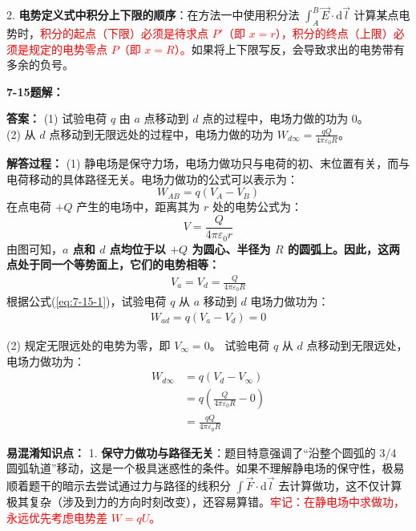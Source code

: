 2. \textbf{电势定义式中积分上下限的顺序}：在方法一中使用积分法 $\int_A^B \vec{E} \cdot \mathrm{d}\vec{l}$ 计算某点电势时，\textcolor{red}{积分的起点（下限）必须是待求点 $P'$（即 $x=r$），积分的终点（上限）必须是规定的电势零点 $P$（即 $x=R$）。}如果将上下限写反，会导致求出的电势带有多余的负号。

\vspace{2em}

\textbf{7-15题解： }
\setcounter{equation}{0}
\renewcommand{\theHequation}{7-15.\arabic{equation}}

\textbf{答案： }
(1) 试验电荷 $q$ 由 $a$ 点移动到 $d$ 点的过程中，电场力做的功为 $0$。\\
(2) 从 $d$ 点移动到无限远处的过程中，电场力做的功为 $W_{d\infty} = \frac{qQ}{4\pi\varepsilon_0 R}$。

\textbf{解答过程： }
(1) 静电场是保守力场，电场力做功只与电荷的初、末位置有关，而与电荷移动的具体路径无关。电场力做功的公式可以表示为：
\begin{equation}\label{eq:7-15-1}
	W_{AB} = q(V_A - V_B)
\end{equation}
在点电荷 $+Q$ 产生的电场中，距离其为 $r$ 处的电势公式为：
\begin{equation}\label{eq:7-15-2}
	V = \frac{Q}{4\pi\varepsilon_0 r}
\end{equation}
由图可知，\textbf{$a$ 点和 $d$ 点均位于以 $+Q$ 为圆心、半径为 $R$ 的圆弧上。因此，这两点处于同一个等势面上，它们的电势相等：}
\begin{align*}
	V_a = V_d = \frac{Q}{4\pi\varepsilon_0 R}
\end{align*}
根据公式(\ref{eq:7-15-1})，试验电荷 $q$ 从 $a$ 移动到 $d$ 电场力做功为：
\begin{align*}
	W_{ad} = q(V_a - V_d) = 0
\end{align*}

(2) 规定无限远处的电势为零，即 $V_\infty = 0$。
试验电荷 $q$ 从 $d$ 点移动到无限远处，电场力做功为：
\begin{align*}
	W_{d\infty} &= q(V_d - V_\infty) \\
	&= q\left(\frac{Q}{4\pi\varepsilon_0 R} - 0\right) \\
	&= \frac{qQ}{4\pi\varepsilon_0 R}
\end{align*}

\textbf{易混淆知识点： }
1. \textbf{保守力做功与路径无关}：题目特意强调了“沿整个圆弧的 3/4 圆弧轨道”移动，这是一个极具迷惑性的条件。如果不理解静电场的保守性，极易顺着题干的暗示去尝试通过力与路径的线积分 $\int \vec{F} \cdot \mathrm{d}\vec{l}$ 去计算做功，这不仅计算极其复杂（涉及到力的方向时刻改变），还容易算错。\textcolor{red}{牢记：在静电场中求做功，永远优先考虑电势差 $W=qU$。}

